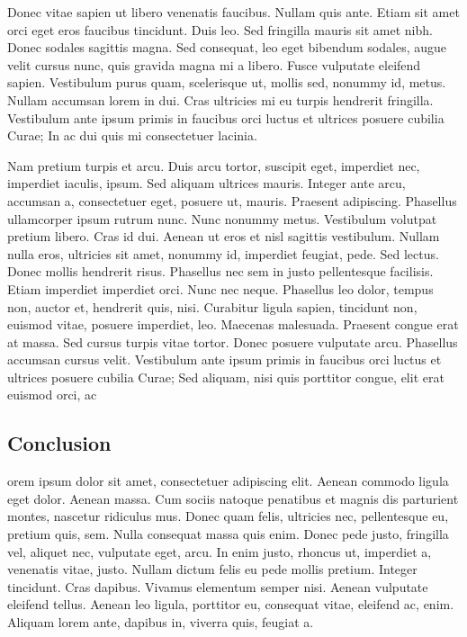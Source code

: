 \documentclass[]{cik}%
\begin{document}
Donec vitae sapien ut libero venenatis faucibus. Nullam quis ante. Etiam
sit amet orci eget eros faucibus tincidunt. Duis leo. Sed fringilla
mauris sit amet nibh. Donec sodales sagittis magna. Sed consequat, leo
eget bibendum sodales, augue velit cursus nunc, quis gravida magna mi a
libero. Fusce vulputate eleifend sapien. Vestibulum purus quam,
scelerisque ut, mollis sed, nonummy id, metus. Nullam accumsan lorem in
dui. Cras ultricies mi eu turpis hendrerit fringilla. Vestibulum ante
ipsum primis in faucibus orci luctus et ultrices posuere cubilia Curae;
In ac dui quis mi consectetuer lacinia.

Nam pretium turpis et arcu. Duis arcu tortor, suscipit eget, imperdiet
nec, imperdiet iaculis, ipsum. Sed aliquam ultrices mauris. Integer ante
arcu, accumsan a, consectetuer eget, posuere ut, mauris. Praesent
adipiscing. Phasellus ullamcorper ipsum rutrum nunc. Nunc nonummy metus.
Vestibulum volutpat pretium libero. Cras id dui. Aenean ut eros et nisl
sagittis vestibulum. Nullam nulla eros, ultricies sit amet, nonummy id,
imperdiet feugiat, pede. Sed lectus. Donec mollis hendrerit risus.
Phasellus nec sem in justo pellentesque facilisis. Etiam imperdiet
imperdiet orci. Nunc nec neque. Phasellus leo dolor, tempus non, auctor
et, hendrerit quis, nisi. Curabitur ligula sapien, tincidunt non,
euismod vitae, posuere imperdiet, leo. Maecenas malesuada. Praesent
congue erat at massa. Sed cursus turpis vitae tortor. Donec posuere
vulputate arcu. Phasellus accumsan cursus velit. Vestibulum ante ipsum
primis in faucibus orci luctus et ultrices posuere cubilia Curae; Sed
aliquam, nisi quis porttitor congue, elit erat euismod orci, ac

\hypertarget{conclusion}{%
\subsection{Conclusion}\label{conclusion}}

orem ipsum dolor sit amet, consectetuer adipiscing elit. Aenean commodo
ligula eget dolor. Aenean massa. Cum sociis natoque penatibus et magnis
dis parturient montes, nascetur ridiculus mus. Donec quam felis,
ultricies nec, pellentesque eu, pretium quis, sem. Nulla consequat massa
quis enim. Donec pede justo, fringilla vel, aliquet nec, vulputate eget,
arcu. In enim justo, rhoncus ut, imperdiet a, venenatis vitae, justo.
Nullam dictum felis eu pede mollis pretium. Integer tincidunt. Cras
dapibus. Vivamus elementum semper nisi. Aenean vulputate eleifend
tellus. Aenean leo ligula, porttitor eu, consequat vitae, eleifend ac,
enim. Aliquam lorem ante, dapibus in, viverra quis, feugiat a.
\end{document}
